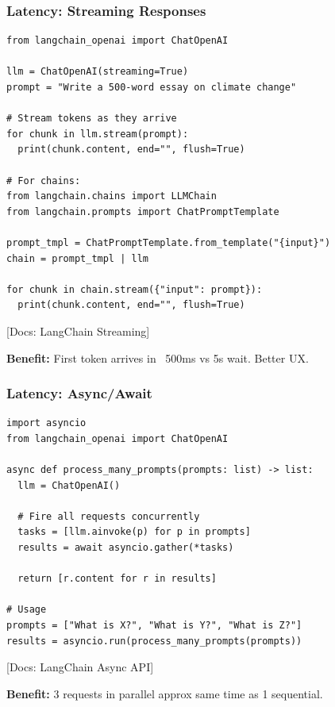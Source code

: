 \documentclass[aspectratio=169,11pt]{beamer}
\newcommand{\docref}[1]{{\scriptsize\color{docgray}[Docs: #1]}}
\begin{document}
\begin{frame}[fragile]
\frametitle{Latency: Streaming Responses}

\begin{lstlisting}
from langchain_openai import ChatOpenAI

llm = ChatOpenAI(streaming=True)
prompt = "Write a 500-word essay on climate change"

# Stream tokens as they arrive
for chunk in llm.stream(prompt):
  print(chunk.content, end="", flush=True)

# For chains:
from langchain.chains import LLMChain
from langchain.prompts import ChatPromptTemplate

prompt_tmpl = ChatPromptTemplate.from_template("{input}")
chain = prompt_tmpl | llm

for chunk in chain.stream({"input": prompt}):
  print(chunk.content, end="", flush=True)
\end{lstlisting}

\docref{LangChain Streaming}
\vspace{-0.15cm}

\small\textbf{Benefit:} First token arrives in ~500ms vs 5s wait. Better UX.

\end{frame}

\begin{frame}[fragile]
\frametitle{Latency: Async/Await}

\vspace{-0.1cm}
\begin{lstlisting}
import asyncio
from langchain_openai import ChatOpenAI

async def process_many_prompts(prompts: list) -> list:
  llm = ChatOpenAI()

  # Fire all requests concurrently
  tasks = [llm.ainvoke(p) for p in prompts]
  results = await asyncio.gather(*tasks)

  return [r.content for r in results]

# Usage
prompts = ["What is X?", "What is Y?", "What is Z?"]
results = asyncio.run(process_many_prompts(prompts))
\end{lstlisting}

\docref{LangChain Async API}

\small\textbf{Benefit:} 3 requests in parallel approx same time as 1 sequential.

\end{frame}
\end{document}
